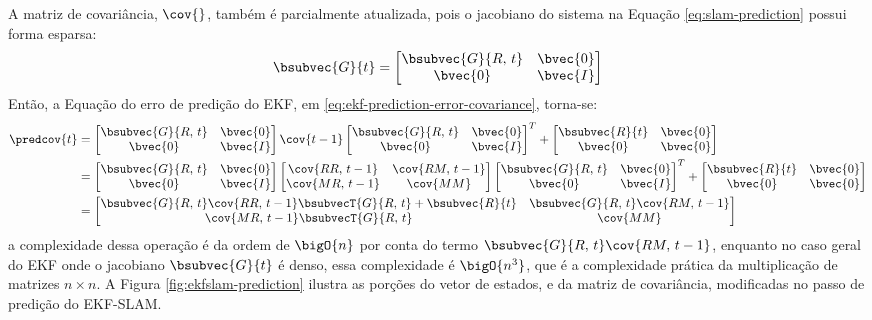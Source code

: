 A matriz de covariância, $\cov{}$, também é parcialmente atualizada, pois o jacobiano do sistema na Equação \ref{eq:slam-prediction} possui forma esparsa:
\begin{equation}
  \bsubvec{G}{t} = \begin{bmatrix}
    \bsubvec{G}{R, \,t} & \bvec{0} \\
    \bvec{0} & \bvec{I}
  \end{bmatrix}
\end{equation}
Então, a Equação do erro de predição do EKF, em \ref{eq:ekf-prediction-error-covariance}, torna-se:
\renewcommand{\arraystretch}{1.5}
\begin{equation}
\begin{aligned}
  \predcov{t} &= \begin{bmatrix}
    \bsubvec{G}{R, \,t} & \bvec{0} \\
    \bvec{0} & \bvec{I}
  \end{bmatrix} \cov{t-1}  \begin{bmatrix}
    \bsubvec{G}{R, \,t} & \bvec{0} \\
    \bvec{0} & \bvec{I}  
  \end{bmatrix}^T + \begin{bmatrix}
      \bsubvec{R}{t}  & \bvec{0} \\ \bvec{0} & \bvec{0}
    \end{bmatrix} \\
  &= \begin{bmatrix}
    \bsubvec{G}{R, \,t} & \bvec{0} \\
    \bvec{0} & \bvec{I}
  \end{bmatrix} 
  \begin{bmatrix}
    \cov{RR, \, t-1} & \cov{RM, \, t-1} \\
    \cov{MR, \,t-1} & \cov{MM}
  \end{bmatrix}  
  \begin{bmatrix}
    \bsubvec{G}{R, \,t} & \bvec{0} \\
    \bvec{0} & \bvec{I}  
  \end{bmatrix}^T + \begin{bmatrix}
      \bsubvec{R}{t} & \bvec{0} \\ \bvec{0} & \bvec{0}
    \end{bmatrix} \\
  &= \begin{bmatrix}
    \bsubvec{G}{R,\,t} \cov{RR,\, t-1} \bsubvecT{G}{R, \,t} + \bsubvec{R}{t}&  \bsubvec{G}{R,\, t} \cov{RM,\, t-1}\\
    \cov{MR,\, t-1}\bsubvecT{G}{R,\, t} & \cov{MM} 
  \end{bmatrix} 
\end{aligned}
\label{eq:ekf-slam-prediction-error-covariance}
\end{equation}
\renewcommand{\arraystretch}{1.0}
a complexidade dessa operação é da ordem de $\bigO{n}$ por conta do termo $\bsubvec{G}{R,\, t} \cov{RM,\, t-1}$, enquanto no caso geral do EKF onde o jacobiano $\bsubvec{G}{t}$ é denso, essa complexidade é $\bigO{n^3}$, que é a complexidade prática da multiplicação de matrizes $n \times n$. A Figura 
\ref{fig:ekfslam-prediction} ilustra as porções do vetor de estados, e da 
matriz de covariância, modificadas no passo de predição do EKF-SLAM.

